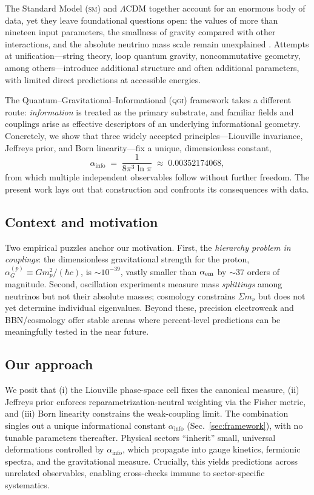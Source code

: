 \documentclass{article}
\numberwithin{equation}{section}
\theoremstyle{plain}
\theoremstyle{definition}
\theoremstyle{remark}
\newcommand{\qgi}{\textsc{qgi}}
\newcommand{\sm}{\textsc{sm}}
\newcommand{\ainfoexact}{\frac{1}{8\pi^3\ln\pi}}
\newcommand{\ainfoapprox}{0.00352174068}
\begin{document}
The Standard Model (\sm) and $\Lambda$CDM together account for an enormous body of data, yet they leave foundational questions open: the values of more than nineteen input parameters, the smallness of gravity compared with other interactions, and the absolute neutrino mass scale remain unexplained \cite{PDG2024}. Attempts at unification---string theory, loop quantum gravity, noncommutative geometry, among others---introduce additional structure and often additional parameters, with limited direct predictions at accessible energies.

The Quantum--Gravitational--Informational (\qgi) framework takes a different route: \emph{information} is treated as the primary substrate, and familiar fields and couplings arise as effective descriptors of an underlying informational geometry. Concretely, we show that three widely accepted principles---Liouville invariance, Jeffreys prior, and Born linearity---fix a unique, dimensionless constant,
\[
\alpha_{\text{info}} \;=\; \ainfoexact \;\approx\; \ainfoapprox,
\]
from which multiple independent observables follow without further freedom. The present work lays out that construction and confronts its consequences with data.

\subsection{Context and motivation}
\label{sec:intro_context}
Two empirical puzzles anchor our motivation. First, the \emph{hierarchy problem in couplings}: the dimensionless gravitational strength for the proton, $\alpha_G^{(p)} \equiv G m_p^2/(\hbar c)$, is $\sim 10^{-39}$, vastly smaller than $\alpha_{\rm em}$ by $\sim 37$ orders of magnitude. Second, oscillation experiments measure mass \emph{splittings} among neutrinos but not their absolute masses; cosmology constrains $\Sigma m_\nu$ but does not yet determine individual eigenvalues. Beyond these, precision electroweak and BBN/cosmology offer stable arenas where percent-level predictions can be meaningfully tested in the near future.

\subsection{Our approach}
\label{sec:intro_approach}
We posit that (i) the Liouville phase-space cell fixes the canonical measure, (ii) Jeffreys prior enforces reparametrization-neutral weighting via the Fisher metric, and (iii) Born linearity constrains the weak-coupling limit. The combination singles out a unique informational constant $\alpha_{\text{info}}$ (Sec.~\ref{sec:framework}), with no tunable parameters thereafter. Physical sectors ``inherit'' small, universal deformations controlled by $\alpha_{\text{info}}$, which propagate into gauge kinetics, fermionic spectra, and the gravitational measure. Crucially, this yields predictions across unrelated observables, enabling cross-checks immune to sector-specific systematics.
\end{document}
